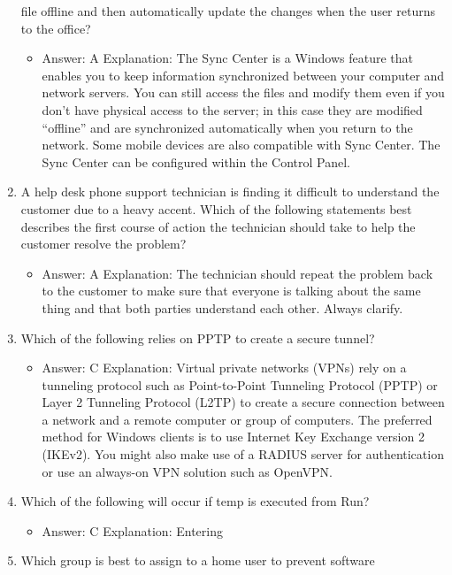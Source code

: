 \documentclass{article}
\begin{document}
\begin{enumerate}
file offline and then automatically update the changes when the
user returns to the office?
    \begin{itemize}
        \item Answer: A
Explanation: The Sync Center is a Windows feature that enables you to keep information
synchronized between your computer and network servers. You can still access
the files and modify them even if you don’t have physical access to the server; in this
case they are modified “offline” and are synchronized automatically when you return
to the network. Some mobile devices are also compatible with Sync Center. The Sync
Center can be configured within the Control Panel.
    \end{itemize}
    \item A help desk phone support technician is finding it difficult to
understand the customer due to a heavy accent. Which of the
following statements best describes the first course of action the
technician should take to help the customer resolve the problem?
    \begin{itemize}
        \item Answer: A
Explanation: The technician should repeat the problem back to the customer to make
sure that everyone is talking about the same thing and that both parties understand
each other. Always clarify.
    \end{itemize}
    \item Which of the following relies on PPTP to create a secure tunnel?
    \begin{itemize}
        \item Answer: C
Explanation: Virtual private networks (VPNs) rely on a tunneling protocol such as
Point-to-Point Tunneling Protocol (PPTP) or Layer 2 Tunneling Protocol (L2TP) to
create a secure connection between a network and a remote computer or group of
computers. The preferred method for Windows clients is to use Internet Key Exchange
version 2 (IKEv2). You might also make use of a RADIUS server for authentication or
use an always-on VPN solution such as OpenVPN.
    \end{itemize}
    \item Which of the following will occur if temp is executed from
Run?
    \begin{itemize}
        \item Answer: C
Explanation: Entering
    \end{itemize}
    \item Which group is best to assign to a home user to prevent software

\end{enumerate}
\end{document}
